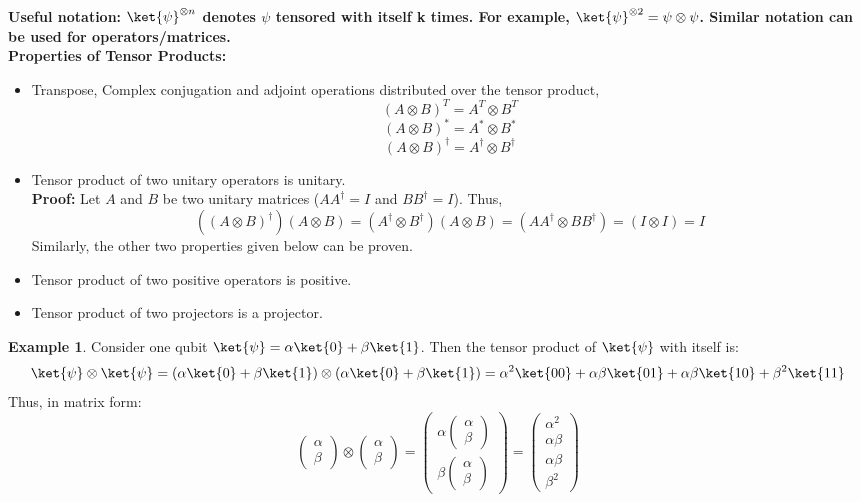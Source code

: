\documentclass[12pt, oneside]{book}
\theoremstyle{definition}
\theoremstyle{definition}
\newtheorem{example}{Example}[section]
\theoremstyle{remark}
\begin{document}
\textbf{Useful notation: $\ket{\psi}^{\otimes n}$ denotes $\psi$ tensored with itself k times. For example, $\ket{\psi}^{\otimes 2} = \psi \otimes \psi$. Similar notation can be used for operators/matrices.}
\\
\textbf{Properties of Tensor Products: }
\begin{itemize}
    \item Transpose, Complex conjugation and adjoint operations distributed over the tensor product,
    \[ (A \otimes B)^T = A^T \otimes B^T \]
    \[ (A \otimes B)^{*}=A^{*} \otimes B^{*} \]
    \[ (A \otimes B)^{\dagger}=A^{\dagger} \otimes B^{\dagger} \]
    \item Tensor product of two unitary operators is unitary.\\
    \textbf{Proof: }Let $A$ and $B$ be two unitary matrices ($AA^{\dagger}=I$ and $BB^{\dagger}=I$). Thus,
    \[
    ((A\otimes B)^{\dagger})(A \otimes B)=(A^{\dagger} \otimes B^{\dagger})(A \otimes B) = (AA^{\dagger} \otimes BB^{\dagger})=(I \otimes I)= I
    \]
    Similarly, the other two properties given below can be proven.
    \item Tensor product of two positive operators is positive.
    \item Tensor product of two projectors is a projector.
\end{itemize}
\begin{example}
    Consider one qubit $\ket{\psi}=\alpha \ket{0} + \beta \ket{1}$. Then the tensor product of $\ket{\psi}$ with itself is:
    \[ \ket{\psi} \otimes \ket{\psi} = (\alpha \ket{0} + \beta \ket{1}) \otimes (\alpha \ket{0} + \beta \ket{1}) = \alpha^2 \ket{00} + \alpha \beta \ket{01} + \alpha \beta \ket{10} + \beta^2 \ket{11} \]
    Thus, in matrix form:
    \[ \begin{pmatrix} \alpha \\ \beta \end{pmatrix} \otimes \begin{pmatrix} \alpha \\ \beta \end{pmatrix} = \begin{pmatrix} \alpha \begin{pmatrix} \alpha \\ \beta \end{pmatrix} \\ \beta \begin{pmatrix} \alpha \\ \beta \end{pmatrix} \end{pmatrix} = \begin{pmatrix} \alpha^2 \\ \alpha \beta \\ \alpha \beta \\ \beta^2 \end{pmatrix} \]
\end{example}
\end{document}
